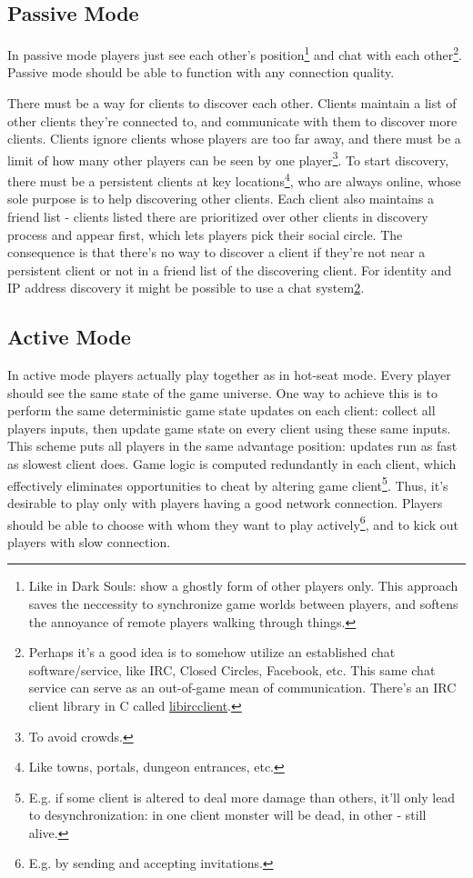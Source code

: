 \documentclass[12pt]{article}
\begin{document}
\subsection{Passive Mode}

In passive mode players just see each other's position\footnote{
    Like in Dark Souls: show a ghostly form of other players only.
    This approach saves the neccessity to synchronize game worlds
    between players, and softens the annoyance of remote players
    walking through things.
} and chat with each other\footnote{
    \label{Chat}
    Perhaps it's a good idea is to somehow utilize an established chat
    software/service, like IRC, Closed Circles, Facebook, etc.
    This same chat service can serve as an out-of-game mean of
    communication.
    There's an IRC client library in C called
    \href{http://www.ulduzsoft.com/libircclient/index.html}%
    {libircclient}.
}.
Passive mode should be able to function with any connection quality.

There must be a way for clients to discover each other.
Clients maintain a list of other clients they're connected to,
and communicate with them to discover more clients.
Clients ignore clients whose players are too far away, and there must
be a limit of how many other players can be seen by one player\footnote{
    To avoid crowds.
}.
To start discovery, there must be a persistent clients at key
locations\footnote{
    Like towns, portals, dungeon entrances, etc.
}, who are always online, whose sole purpose is to help discovering other
clients.
Each client also maintains a friend list - clients listed there are
prioritized over other clients in discovery process and appear first,
which lets players pick their social circle.
The consequence is that there's no way to discover a client if
they're not near a persistent client or not in a friend list of the
discovering client.
For identity and IP address discovery it might be possible to use a chat
system\cref{Chat}.

\subsection{Active Mode}

In active mode players actually play together as in hot-seat mode.
Every player should see the same state of the game universe.
One way to achieve this is to perform the same deterministic game
state updates on each client: collect all players inputs, then
update game state on every client using these same inputs.
This scheme puts all players in the same advantage position:
updates run as fast as slowest client does.
Game logic is computed redundantly in each client, which effectively
eliminates opportunities to cheat by altering game client\footnote{
    E.g. if some client is altered to deal more damage than others,
    it'll only lead to desynchronization: in one client monster
    will be dead, in other - still alive.}.
Thus, it's desirable to play only with players having a good network connection.
Players should be able to choose with whom they want to play
actively\footnote{
    E.g. by sending and accepting invitations.
}, and to kick out players with slow connection.
\end{document}
